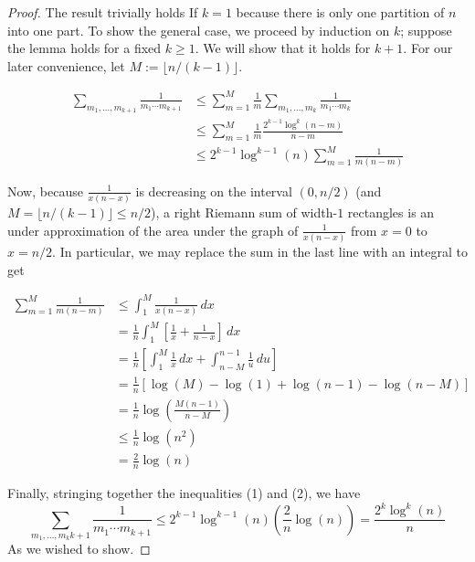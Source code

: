 \begin{proof}
	The result trivially holds If $k=1$ because there is only one partition of $n$ into one part.
	To show the general case, we proceed by induction on $k$; suppose the lemma holds for a fixed $k\ge 1$.
	We will show that it holds for $k+1$.
	For our later convenience, let $M := \lfloor n/(k-1) \rfloor$.
	
	\begin{align*}
	\sum_{m_1,\dots, m_{k+1}} \frac{1}{m_1\cdots m_{k+1}}
	&\le \sum_{m=1}^M \frac{1}{m} \sum_{m_1,\dots,m_k} \frac{1}{m_1\cdots m_k} \tag{inner sum taken over partitions of $n-m$} \\
	&\le \sum_{m=1}^M \frac{1}{m} \frac{2^{k-1}\log^k(n-m)}{n-m} \tag{using the inductive hypothesis} \\
	&\le 2^{k-1}\log^{k-1}(n) \sum_{m=1}^M \frac{1}{m(n-m)} \tag{1} %
	\end{align*}
	
	Now, because $\frac{1}{x(n-x)}$ is decreasing on the interval $(0,n/2)$ (and $M = \lfloor n/(k-1)\rfloor \le n/2$), a right Riemann sum of width-$1$ rectangles is an under approximation of the area under the graph of $\frac{1}{x(n-x)}$ from $x=0$ to $x=n/2$.
	In particular, we may replace the sum in the last line with an integral to get
	
	\begin{align*}
	\sum_{m=1}^M \frac{1}{m(n-m)} 
	&\le \int_1^M \frac{1}{x(n-x)} \,dx \\
	&= \frac{1}{n} \int_1^M \left[ \frac{1}{x} + \frac{1}{n-x} \right] \, dx \tag{partial fraction decomposition of the integrand} \\
	&= \frac{1}{n} \left[ \int_1^M \frac{1}{x}\, dx + \int_{n-M}^{n-1} \frac{1}{u} \, du \right] \tag{substituting $u=n-x$} \\
	&= \frac{1}{n} \left[ \log(M) - \log(1) + \log(n-1) - \log(n-M) \right] \\
	&= \frac{1}{n} \log \left( \frac{M (n-1)}{n-M} \right) \\
	&\le \frac{1}{n} \log(n^2) \\
	&= \frac{2}{n} \log(n) \tag{2}
	\end{align*}
	
	Finally, stringing together the inequalities (1) and (2), we have
	\[\sum_{m_1,\dots, m_k{k+1}} \frac{1}{m_1\cdots m_{k+1}} \le
	2^{k-1}\log^{k-1}(n) \left( \frac{2}{n} \log(n) \right)= 
	\frac{2^k \log^k(n)}{n} \]
	As we wished to show.
\end{proof}

